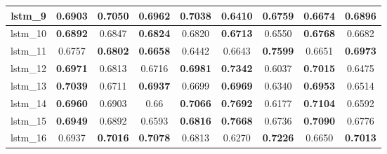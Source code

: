 \begin{table}[p]
\begin{tabular}{|c|c|c|c|c|c|c|c|c|}
        lstm\_9  & 0.6903                              & \textbf{0.7050}                     & 0.6962                              & \textbf{0.7038}                     & 0.6410                              & \textbf{0.6759}                     & 0.6674                              & \textbf{0.6896}                     \\ \hline
        lstm\_10 & \textbf{0.6892}                     & 0.6847                              & \textbf{0.6824}                     & 0.6820                              & \textbf{0.6713}                     & 0.6550                              & \textbf{0.6768}                     & 0.6682                              \\ \hline
        lstm\_11 & 0.6757                              & \textbf{0.6802}                     & \textbf{0.6658}                     & 0.6442                              & 0.6643                              & \textbf{0.7599}                     & 0.6651                              & \textbf{0.6973}                     \\ \hline
        lstm\_12 & \textbf{0.6971}                     & 0.6813                              & 0.6716                              & \textbf{0.6981}                     & \textbf{0.7342}                     & 0.6037                              & \textbf{0.7015}                     & 0.6475                              \\ \hline
        lstm\_13 & \textbf{0.7039}                     & 0.6711                              & \textbf{0.6937}                     & 0.6699                              & \textbf{0.6969}                     & 0.6340                              & \textbf{0.6953}                     & 0.6514                              \\ \hline
        lstm\_14 & \textbf{0.6960}                     & 0.6903                              & 0.66                                & \textbf{0.7066}                     & \textbf{\cellcolor{green!50}0.7692} & 0.6177                              & \textbf{0.7104}                     & 0.6592                              \\ \hline
        lstm\_15 & \textbf{0.6949}                     & 0.6892                              & 0.6593                              & \textbf{0.6816}                     & \textbf{0.7668}                     & 0.6736                              & \textbf{0.7090}                     & 0.6776                              \\ \hline
        lstm\_16 & 0.6937                              & \textbf{0.7016}                     & \textbf{\cellcolor{green!50}0.7078} & 0.6813                              & 0.6270                              & \textbf{0.7226}                     & 0.6650                              & \textbf{0.7013}                     \\ \hline

\end{tabular}
\end{table}
